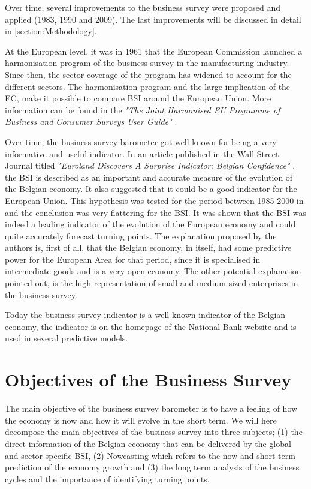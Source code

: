 \documentclass[12pt,a4paper,oneside]{book}
\begin{document}
Over time, several improvements to the business survey were proposed and applied (1983, 1990 and 2009). The last improvements will be discussed in detail in \autoref{section:Methodology}.

At the European level, it was in 1961 that the European Commission launched a harmonisation program of the business survey in the manufacturing industry. 
Since then, the sector coverage of the program has widened to account for the different sectors.
The harmonisation program and the large implication of the EC, make it possible to compare BSI around the European Union.
More information can be found in the \textit{"The Joint Harmonised EU Programme of Business and Consumer Surveys User Guide"} \cite{european_commission_joint_2016}.

Over time, the business survey barometer got well known for being a very informative and useful indicator. 
In an article published in the Wall Street Journal titled \textit{"Euroland Discovers A Surprise Indicator: Belgian Confidence"} \citep{rhoads_euroland_1999}, the BSI is described as an important and accurate measure of the evolution of the Belgian economy. 
It also suggested that it could be a good indicator for the European Union. 
This hypothesis was tested for the period between 1985-2000 in \cite{vanhaelen_belgian_2000} and the conclusion was very flattering for the BSI. 
It was shown that the BSI was indeed a leading indicator of the evolution of the European economy and could quite accurately forecast turning points. 
The explanation proposed by the authors is, first of all, that the Belgian economy, in itself, had some predictive power for the European Area for that period, since it is specialised in intermediate goods and is a very open economy. 
The other potential explanation pointed out, is the high representation of small and medium-sized enterprises in the business survey.

Today the business survey indicator is a well-known indicator of the Belgian economy, the indicator is on the homepage of the National Bank website and is used in several predictive models.



\section{Objectives of the Business Survey}
\label{section:Objective}


The main objective of the business survey barometer is to have a feeling of how the economy is now and how it will evolve in the short term.
We will here decompose the main objectives of the business survey into three subjects; (1) the direct information of the Belgian economy that can be delivered by the global and sector specific BSI, (2) Nowcasting which refers to the now and short term prediction of the economy growth and (3) the long term analysis of the business cycles and the importance of identifying turning points.
\end{document}
